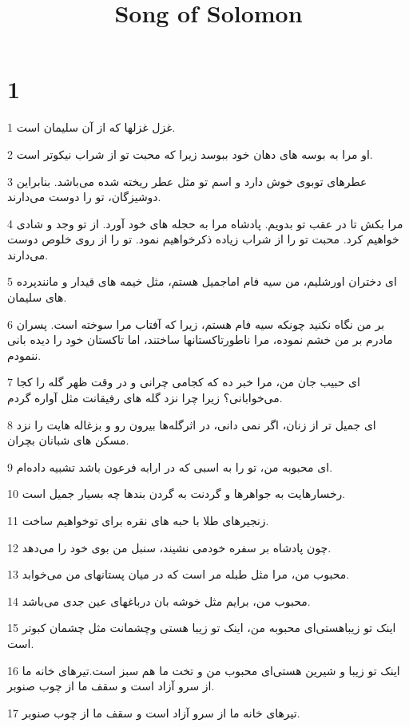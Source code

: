 

\title{Song of Solomon}

 
\chapter{1}

\par 1 غزل غزلها که از آن سلیمان است.
\par 2 او مرا به بوسه های دهان خود ببوسد زیرا که محبت تو از شراب نیکوتر است.
\par 3 عطرهای توبوی خوش دارد و اسم تو مثل عطر ریخته شده می‌باشد. بنابراین دوشیزگان، تو را دوست می‌دارند.
\par 4 مرا بکش تا در عقب تو بدویم. پادشاه مرا به حجله های خود آورد. از تو وجد و شادی خواهیم کرد. محبت تو را از شراب زیاده ذکرخواهیم نمود. تو را از روی خلوص دوست می‌دارند.
\par 5 ‌ای دختران اورشلیم، من سیه فام اماجمیل هستم، مثل خیمه های قیدار و مانندپرده های سلیمان.
\par 6 بر من نگاه نکنید چونکه سیه فام هستم، زیرا که آفتاب مرا سوخته است. پسران مادرم بر من خشم نموده، مرا ناطورتاکستانها ساختند، اما تاکستان خود را دیده بانی ننمودم.
\par 7 ‌ای حبیب جان من، مرا خبر ده که کجامی چرانی و در وقت ظهر گله را کجا می‌خوابانی؟ زیرا چرا نزد گله های رفیقانت مثل آواره گردم.
\par 8 ‌ای جمیل تر از زنان، اگر نمی دانی، در اثرگله‌ها بیرون رو و بزغاله هایت را نزد مسکن های شبانان بچران.
\par 9 ‌ای محبوبه من، تو را به اسبی که در ارابه فرعون باشد تشبیه داده‌ام.
\par 10 رخسارهایت به جواهرها و گردنت به گردن بندها چه بسیار جمیل است.
\par 11 زنجیرهای طلا با حبه های نقره برای توخواهیم ساخت.
\par 12 چون پادشاه بر سفره خودمی نشیند، سنبل من بوی خود را می‌دهد.
\par 13 محبوب من، مرا مثل طبله مر است که در میان پستانهای من می‌خوابد.
\par 14 محبوب من، برایم مثل خوشه بان درباغهای عین جدی می‌باشد.
\par 15 اینک تو زیباهستی‌ای محبوبه من، اینک تو زیبا هستی وچشمانت مثل چشمان کبوتر است.
\par 16 اینک تو زیبا و شیرین هستی‌ای محبوب من و تخت ما هم سبز است.تیرهای خانه ما از سرو آزاد است و سقف ما از چوب صنوبر.
\par 17 تیرهای خانه ما از سرو آزاد است و سقف ما از چوب صنوبر.
 
